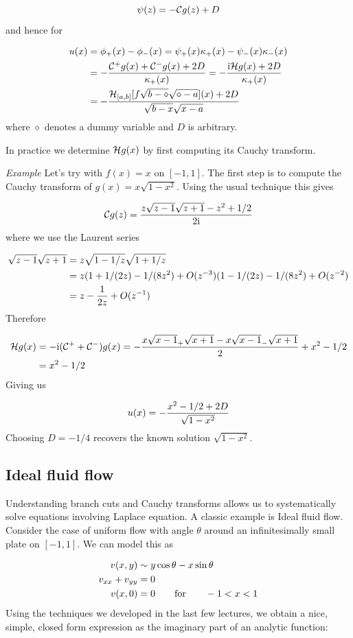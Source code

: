 \documentclass[12pt,a4paper]{article}
\def\qqfor{\qquad\hbox{for}\qquad}
\def\I{ {\rm i} }
\def\CC{ {\cal C} }
\def\HH{ {\cal H} }
\def\addtab#1={#1\;&=}
\def\ccr{\\\addtab}
\def\addtab#1={#1\;&=}
\def\ccr{\\\addtab}
\begin{document}
\[
\psi(z) = -\CC g(z) + D
\]
and hence for


\begin{align*}
u(x) &= \phi_+(x) - \phi_-(x) = \psi_+(x) \kappa_+(x) - \psi_-(x) \kappa_-(x) \\
&= -{\CC^+ g(x) + \CC^- g(x) + 2 D \over \kappa_+(x)}
= -{\I \HH g(x) + 2D \over \kappa_+(x)}\\
& = -{\HH_{[a,b]}[f \sqrt{b-\diamond}\sqrt{\diamond-a}](x) + 2 D \over \sqrt{b-x} \sqrt{x-a}}
\end{align*}
where $\diamond$ denotes a dummy variable and $D$ is arbitrary.

In practice we determine $\HH g(x)$ by first computing its Cauchy transform.

\emph{Example} Let's try with $f(x) = x$ on $[-1,1]$. The first step is to compute the Cauchy transform of $g(x) = x \sqrt{1-x^2}$.  Using the usual technique this gives

\[
\CC g(z) = {z \sqrt{z-1} \sqrt{z+1} - z^2 +1/2 \over 2 \I}
\]
where we use the Laurent series


\begin{align*}
\sqrt{z-1} \sqrt{z+1} &= z \sqrt{1-1/z} \sqrt{1 + 1/z} \ccr
= z (1+1/(2z) - 1/(8 z^2) + O(z^{-3})(1-1/(2z)  - 1/(8 z^2) + O(z^{-2}) \ccr
= z -{1 \over 2 z} + O(z^{-1})
\end{align*}
Therefore


\begin{align*}
\HH g(x) &= -\I (\CC^+ + \CC^-) g(x) = - {x \sqrt{x-1}_+ \sqrt{x+1} - x \sqrt{x-1}_- \sqrt{x+1} \over 2} + x^2 - 1/2 \ccr
= x^2 - 1/2
\end{align*}
Giving us

\[
u(x) = -{x^2 - 1/2 + 2 D \over \sqrt{1-x^2}}
\]
Choosing $D = -1/4$ recovers the known solution $\sqrt{1-x^2}$.

\subsection{Ideal fluid flow}
Understanding branch cuts and Cauchy transforms allows us to systematically solve equations involving Laplace equation.  A classic example is Ideal fluid flow. Consider the case of uniform flow with angle $\theta$ around an infinitesimally small  plate on $[-1,1]$. We can model this as


\begin{align*}
v(x,y) &\sim y \cos \theta - x \sin \theta  \\
v_{xx} + v_{yy} &= 0 \\
v(x,0) & = 0 \qqfor -1 < x <1
\end{align*}
Using the techniques we developed in the last few lectures, we obtain a nice, simple, closed form expression as the  imaginary part of an analytic function:
\end{document}
